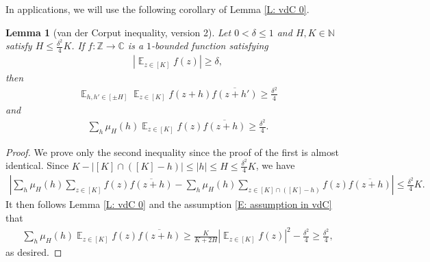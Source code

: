 \documentclass[11pt]{amsart}
\newtheorem{lemma}{Lemma}[section]
\theoremstyle{definition}
\DeclareMathOperator*{\E}{\mathbb{E}}
\newcommand{\C}{{\mathbb C}}
\newcommand{\N}{{\mathbb N}}
\newcommand{\Z}{{\mathbb Z}}
\newcommand{\abs}[1]{\mathopen{}\left| #1\mathclose{}\right|}
\begin{document}
In applications, we will use the following corollary of Lemma \ref{L: vdC 0}.
\begin{lemma}[van der Corput inequality, version 2]\label{L: vdC}
    Let $0<\delta\leq 1$ and $H, K\in\N$ satisfy $H\leq \frac{\delta^2}{4}K$. If $f:\Z\to\C$ is a $1$-bounded function satisfying 
    \begin{align}\label{E: assumption in vdC}
        \abs{\E_{z\in[K]}f(z)}\geq \delta,
    \end{align}
    then
    \begin{align*}
        \E_{h,h'\in[\pm H]}\E_{z\in[K]}f(z+h)\overline{f(z+h')}\geq \frac{\delta^2}{4}
    \end{align*}
    and
    \begin{align*}
        {\sum_{h}\mu_H(h)\E_{z\in[K]}f(z)\overline{f(z+h)}}\geq \frac{\delta^2}{4}.
    \end{align*}
\end{lemma}
\begin{proof}
We prove only the second inequality since the proof of the first is almost identical.
    Since $K - |[K]\cap([K]-h)|\leq |h|\leq H\leq \frac{\delta^2}{4}K$, we have
    \begin{align*}
    \abs{\sum_{h}\mu_H(h)\sum_{z\in[K]}f(z)\overline{f(z+h)} - \sum_{h}\mu_H(h)\sum_{z\in[K]\cap([K]-h)}f(z)\overline{f(z+h)}}\leq \frac{\delta^2}{4}K. 
    \end{align*}
    It then follows Lemma \ref{L: vdC 0} and the assumption \eqref{E: assumption in vdC} that
    \begin{align*}
        {\sum_{h}\mu_H(h)\E_{z\in[K]}f(z)\overline{f(z+h)}}\geq \frac{K}{K+2H}\abs{\E_{z\in[K]}f(z)}^2 - \frac{\delta^2}{4}\geq \frac{\delta^2}{4},
    \end{align*}
    as desired.
\end{proof}
\end{document}
